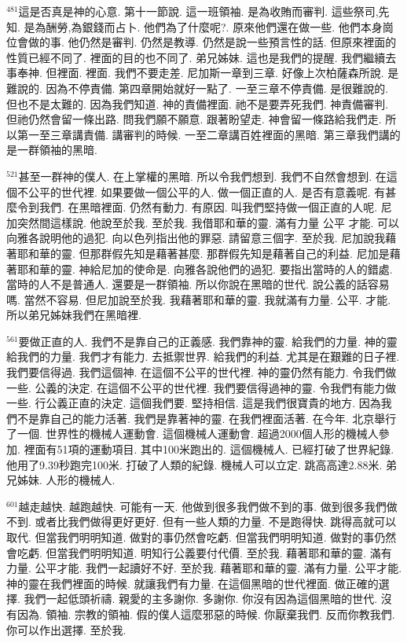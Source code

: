 \documentclass{book}
\begin{document}
$^{481}$這是否真是神的心意.
第十一節說.
這一班領袖.
是為收賄而審判.
這些祭司,先知.
是為酬勞,為銀錢而占卜.
他們為了什麼呢?.
原來他們還在做一些.
他們本身崗位會做的事.
他仍然是審判.
仍然是教導.
仍然是說一些預言性的話.
但原來裡面的性質已經不同了.
裡面的目的也不同了.
弟兄姊妹.
這也是我們的提醒.
我們繼續去事奉神.
但裡面.
裡面.
我們不要走差.
尼加斯一章到三章.
好像上次柏薩森所說.
是難說的.
因為不停責備.
第四章開始就好一點了.
一至三章不停責備.
是很難說的.
但也不是太難的.
因為我們知道.
神的責備裡面.
祂不是要弄死我們.
神責備審判.
但祂仍然會留一條出路.
問我們願不願意.
跟著盼望走.
神會留一條路給我們走.
所以第一至三章講責備.
講審判的時候.
一至二章講百姓裡面的黑暗.
第三章我們講的是一群領袖的黑暗.

$^{521}$甚至一群神的僕人.
在上掌權的黑暗.
所以令我們想到.
我們不自然會想到.
在這個不公平的世代裡.
如果要做一個公平的人.
做一個正直的人.
是否有意義呢.
有甚麼令到我們.
在黑暗裡面.
仍然有動力.
有原因.
叫我們堅持做一個正直的人呢.
尼加突然間這樣說.
他說至於我.
至於我.
我借耶和華的靈.
滿有力量 公平 才能.
可以向雅各說明他的過犯.
向以色列指出他的罪惡.
請留意三個字.
至於我.
尼加說我藉著耶和華的靈.
但那群假先知是藉著甚麼.
那群假先知是藉著自己的利益.
尼加是藉著耶和華的靈.
神給尼加的使命是.
向雅各說他們的過犯.
要指出當時的人的錯處.
當時的人不是普通人.
還要是一群領袖.
所以你說在黑暗的世代.
說公義的話容易嗎.
當然不容易.
但尼加說至於我.
我藉著耶和華的靈.
我就滿有力量.
公平.
才能.
所以弟兄姊妹我們在黑暗裡.

$^{561}$要做正直的人.
我們不是靠自己的正義感.
我們靠神的靈.
給我們的力量.
神的靈給我們的力量.
我們才有能力.
去抵禦世界.
給我們的利益.
尤其是在艱難的日子裡.
我們要信得過.
我們這個神.
在這個不公平的世代裡.
神的靈仍然有能力.
令我們做一些.
公義的決定.
在這個不公平的世代裡.
我們要信得過神的靈.
令我們有能力做一些.
行公義正直的決定.
這個我們要.
堅持相信.
這是我們很寶貴的地方.
因為我們不是靠自己的能力活著.
我們是靠著神的靈.
在我們裡面活著.
在今年.
北京舉行了一個.
世界性的機械人運動會.
這個機械人運動會.
超過2000個人形的機械人參加.
裡面有51項的運動項目.
其中100米跑出的.
這個機械人.
已經打破了世界紀錄.
他用了9.39秒跑完100米.
打破了人類的紀錄.
機械人可以立定.
跳高高達2.88米.
弟兄姊妹.
人形的機械人.

$^{601}$越走越快.
越跑越快.
可能有一天.
他做到很多我們做不到的事.
做到很多我們做不到.
或者比我們做得更好更好.
但有一些人類的力量.
不是跑得快.
跳得高就可以取代.
但當我們明明知道.
做對的事仍然會吃虧.
但當我們明明知道.
做對的事仍然會吃虧.
但當我們明明知道.
明知行公義要付代價.
至於我.
藉著耶和華的靈.
滿有力量.
公平才能.
我們一起讀好不好.
至於我.
藉著耶和華的靈.
滿有力量.
公平才能.
神的靈在我們裡面的時候.
就讓我們有力量.
在這個黑暗的世代裡面.
做正確的選擇.
我們一起低頭祈禱.
親愛的主多謝你.
多謝你.
你沒有因為這個黑暗的世代.
沒有因為.
領袖.
宗教的領袖.
假的僕人這麼邪惡的時候.
你厭棄我們.
反而你教我們.
你可以作出選擇.
至於我.
\end{document}
